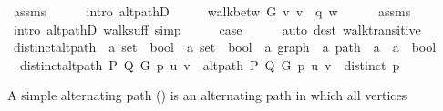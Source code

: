 \begin{isabellebody}
\ assms{\isacharparenleft}{\kern0pt}{}{\isacharparenright}{\kern0pt}\isanewline
\ \ \ \ \isamarkupfalse%
\ {\isacharparenleft}{\kern0pt}intro\ alt{\isacharunderscore}{\kern0pt}pathD{\isacharparenleft}{\kern0pt}{}{\isacharparenright}{\kern0pt}{\isacharparenright}{\kern0pt}\isanewline
\ \ \isamarkupfalse%
\ \isamarkupfalse%
\ {\isachardoublequoteopen}walk{\isacharunderscore}{\kern0pt}betw\ G\ v\ {\isacharparenleft}{\kern0pt}v\ {\isacharhash}{\kern0pt}\ q{\isacharparenright}{\kern0pt}\ w{\isachardoublequoteclose}\isanewline
\ \ \ \ \isamarkupfalse%
\ assms{\isacharparenleft}{\kern0pt}{}{\isacharparenright}{\kern0pt}\isanewline
\ \ \ \ \isamarkupfalse%
\ {\isacharparenleft}{\kern0pt}intro\ alt{\isacharunderscore}{\kern0pt}pathD{\isacharparenleft}{\kern0pt}{}{\isacharparenright}{\kern0pt}\ walk{\isacharunderscore}{\kern0pt}suff{\isacharparenright}{\kern0pt}\ simp\isanewline
\ \ \isamarkupfalse%
\ \isamarkupfalse%
\ {\isacharquery}{\kern0pt}case\isanewline
\ \ \ \ \isamarkupfalse%
\ {\isacharparenleft}{\kern0pt}auto\ dest{\isacharcolon}{\kern0pt}\ walk{\isacharunderscore}{\kern0pt}transitive{\isacharparenright}{\kern0pt}\isanewline
{}\isamarkupfalse%
%
\endisatagproof
{\isafoldproof}%
%
\isadelimproof
\isanewline
%
\endisadelimproof
\isanewline
{}\isamarkupfalse%
\ distinct{\isacharunderscore}{\kern0pt}alt{\isacharunderscore}{\kern0pt}path\ {\isacharcolon}{\kern0pt}{\isacharcolon}{\kern0pt}\ {\isachardoublequoteopen}{\isacharparenleft}{\kern0pt}{\isacharprime}{\kern0pt}a\ set\ {\isasymRightarrow}\ bool{\isacharparenright}{\kern0pt}\ {\isasymRightarrow}\ {\isacharparenleft}{\kern0pt}{\isacharprime}{\kern0pt}a\ set\ {\isasymRightarrow}\ bool{\isacharparenright}{\kern0pt}\ {\isasymRightarrow}\ {\isacharprime}{\kern0pt}a\ graph\ {\isasymRightarrow}\ {\isacharprime}{\kern0pt}a\ path\ {\isasymRightarrow}\ {\isacharprime}{\kern0pt}a\ {\isasymRightarrow}\ {\isacharprime}{\kern0pt}a\ {\isasymRightarrow}\ bool{\isachardoublequoteclose}\ \isanewline
\ \ {\isachardoublequoteopen}distinct{\isacharunderscore}{\kern0pt}alt{\isacharunderscore}{\kern0pt}path\ P\ Q\ G\ p\ u\ v\ {\isasymequiv}\ alt{\isacharunderscore}{\kern0pt}path\ P\ Q\ G\ p\ u\ v\ {\isasymand}\ distinct\ p{\isachardoublequoteclose}%
\begin{isamarkuptext}%
A simple alternating path () is an alternating path in which all vertices

\end{isamarkuptext}
\end{isabellebody}
